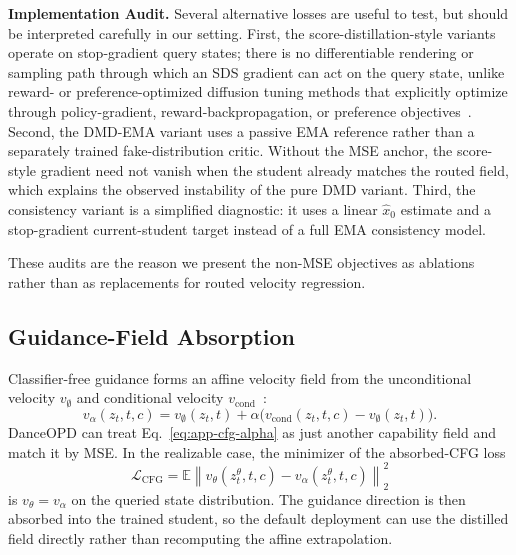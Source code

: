 \noindent\textbf{Implementation Audit.}
Several alternative losses are useful to test, but should be interpreted carefully in our setting. First, the score-distillation-style variants operate on stop-gradient query states; there is no differentiable rendering or sampling path through which an SDS gradient can act on the query state, unlike reward- or preference-optimized diffusion tuning methods that explicitly optimize through policy-gradient, reward-backpropagation, or preference objectives~\cite{black2024training,fan2023dpok,prabhudesai2023aligning,wallace2024diffusion}. Second, the DMD-EMA variant uses a passive EMA reference rather than a separately trained fake-distribution critic. Without the MSE anchor, the score-style gradient need not vanish when the student already matches the routed field, which explains the observed instability of the pure DMD variant. Third, the consistency variant is a simplified diagnostic: it uses a linear $\hat{x}_0$ estimate and a stop-gradient current-student target instead of a full EMA consistency model. 

These audits are the reason we present the non-MSE objectives as ablations rather than as replacements for routed velocity regression.


\vspace{0.2cm}


\subsection{Guidance-Field Absorption}
\label{app:cfg-absorption}

Classifier-free guidance forms an affine velocity field from the unconditional velocity $v_{\emptyset}$ and conditional velocity $v_{\mathrm{cond}}$~\cite{ho2022classifier}:
\begin{equation}
  v_{\alpha}(z_t,t,c)
  =
  v_{\emptyset}(z_t,t)
  +\alpha\bigl(v_{\mathrm{cond}}(z_t,t,c)-v_{\emptyset}(z_t,t)\bigr).
  \label{eq:app-cfg-alpha}
\end{equation}
DanceOPD can treat Eq.~\eqref{eq:app-cfg-alpha} as just another capability field and match it by MSE. In the realizable case, the minimizer of the absorbed-CFG loss
\begin{equation}
  \mathcal{L}_{\mathrm{CFG}}
  =\mathbb{E}\left\|v_\theta(z_t^\theta,t,c)-v_{\alpha}(z_t^\theta,t,c)\right\|_2^2
  \label{eq:app-cfg-mse}
\end{equation}
is $v_\theta=v_{\alpha}$ on the queried state distribution. The guidance direction is then absorbed into the trained student, so the default deployment can use the distilled field directly rather than recomputing the affine extrapolation.

